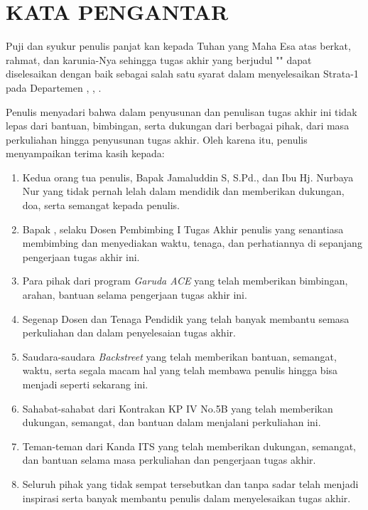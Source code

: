 \chapter*{KATA PENGANTAR}

\vspace{2ex}


Puji dan syukur penulis panjat kan kepada Tuhan yang Maha Esa atas
berkat, rahmat, dan karunia-Nya sehingga tugas akhir yang berjudul "\tatitle" dapat
diselesaikan dengan baik sebagai salah satu syarat dalam menyelesaikan Strata-1
pada Departemen \studyprogram{}, \faculty{}, \institute{}.

Penulis menyadari bahwa dalam penyusunan dan penulisan tugas akhir ini
tidak lepas dari bantuan, bimbingan, serta dukungan dari berbagai pihak, dari masa
perkuliahan hingga penyusunan tugas akhir. Oleh karena itu, penulis menyampaikan
terima kasih kepada:

\begin{enumerate}[nolistsep, noitemsep,topsep=0pt]

  \item Kedua orang tua penulis, Bapak Jamaluddin S, S.Pd., dan 
  Ibu Hj. Nurbaya Nur yang tidak pernah lelah dalam mendidik dan 
  memberikan dukungan, doa, serta semangat kepada penulis.

  \item Bapak \advisor{}, selaku Dosen Pembimbing I Tugas 
  Akhir penulis yang senantiasa membimbing
  dan menyediakan waktu, tenaga, dan perhatiannya di sepanjang 
  pengerjaan tugas akhir ini.

  \item Para pihak dari program \emph{Garuda ACE} yang telah memberikan
  bimbingan, arahan, bantuan selama pengerjaan tugas akhir ini.

  \item Segenap Dosen dan Tenaga Pendidik \department{} \faculty{} \institute{}
  yang telah banyak membantu semasa perkuliahan dan dalam penyelesaian tugas akhir.

  \item Saudara-saudara \emph{Backstreet} yang telah memberikan
  bantuan, semangat, waktu, serta segala macam hal yang telah membawa
  penulis hingga bisa menjadi seperti sekarang ini.

  \item Sahabat-sahabat dari Kontrakan KP IV No.5B yang telah memberikan
  dukungan, semangat, dan bantuan dalam menjalani perkuliahan ini.

  \item Teman-teman dari Kanda ITS yang telah memberikan dukungan, semangat,
  dan bantuan selama masa perkuliahan dan pengerjaan tugas akhir.

  \item Seluruh pihak yang tidak sempat tersebutkan dan tanpa sadar telah
  menjadi inspirasi serta banyak membantu penulis dalam menyelesaikan tugas akhir.

\end{enumerate}

